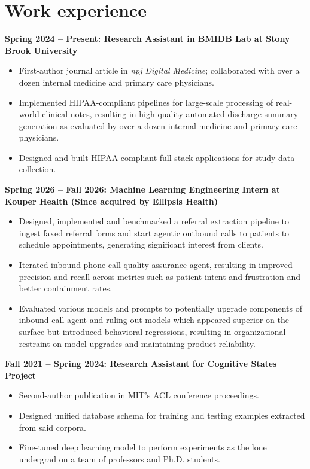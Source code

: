 \documentclass[letterpaper,10pt]{article}
\newcommand{\role}[1]{\par\vspace{5pt}\textbf{#1}\par\nopagebreak}
\begin{document}
\section{Work experience}
\role{Spring 2024 -- Present: Research Assistant in BMIDB Lab at Stony Brook University}
\begin{itemize}
\item First-author journal article in \textit{npj Digital Medicine}; collaborated with over a dozen internal medicine and primary care physicians.
\item Implemented HIPAA-compliant pipelines for large-scale processing of real-world clinical notes, resulting in high-quality automated discharge summary generation as evaluated by over a dozen internal medicine and primary care physicians.
\item Designed and built HIPAA-compliant full-stack applications for study data collection.
\end{itemize}
\role{Spring 2026 -- Fall 2026: Machine Learning Engineering Intern at Kouper Health (Since acquired by Ellipsis Health)}
\begin{itemize}
\item Designed, implemented and benchmarked a referral extraction pipeline to ingest faxed referral forms and start agentic outbound calls to patients to schedule appointments, generating significant interest from clients.
\item Iterated inbound phone call quality assurance agent, resulting in improved precision and recall across metrics such as patient intent and frustration and better containment rates.
\item Evaluated various models and prompts to potentially upgrade components of inbound call agent and ruling out models which appeared superior on the surface but introduced behavioral regressions, resulting in organizational restraint on model upgrades and maintaining product reliability.
\end{itemize}
\role{Fall 2021 -- Spring 2024: Research Assistant for Cognitive States Project}
\begin{itemize}
\item Second-author publication in MIT’s ACL conference proceedings.
\item Designed unified database schema for training and testing examples extracted from said corpora.
\item Fine-tuned deep learning model to perform experiments as the lone undergrad on a team of professors and Ph.D. students.
\end{itemize}
\end{document}

